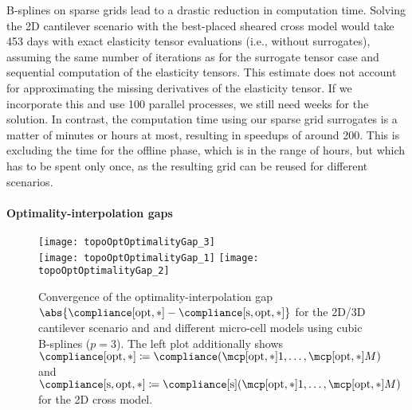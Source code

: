 B-splines on sparse grids lead to a drastic reduction in computation time.
Solving the 2D cantilever scenario with the best-placed sheared cross model
would take 453 days with
exact elasticity tensor evaluations (i.e., without surrogates),
assuming the same number of iterations as for the surrogate tensor case
and sequential computation of the elasticity tensors.
This estimate does not account for approximating the missing derivatives
of the elasticity tensor.
If we incorporate this and use 100 parallel processes,
we still need weeks for the solution.
In contrast, the computation time using our sparse grid surrogates
is a matter of minutes or hours at most,
resulting in speedups of around 200.
This is excluding the time for the offline phase,
which is in the range of hours, but which has to be spent only once,
as the resulting grid can be reused for different scenarios.

\vspace{2em}

\paragraph{Optimality-interpolation gaps}

\begin{figure}
  \texttt{[image: topoOptOptimalityGap\_3]}%
  \\[2mm]%
  \texttt{[image: topoOptOptimalityGap\_1]}%
  \hfill%
  \texttt{[image: topoOptOptimalityGap\_2]}%
  \caption[Convergence of the optimality-interpolation gap]{%
    Convergence of the optimality-interpolation gap
    $\abs{\compliance[\opt,\ast] - \complianceintp[\opt,\ast]}$
    for the 2D/3D cantilever scenario and
    and different micro-cell models using cubic B-splines ($p = 3$).
    The left plot additionally shows
    $\compliance[\opt,\ast]
    \ceq \compliance(\mcpoptappr{1}, \dotsc, \mcpoptappr{M})$ and
    $\complianceintp[\opt,\ast]
    \ceq \complianceintp(\mcpoptappr{1}, \dotsc, \mcpoptappr{M})$
    for the 2D cross model.%
  }%
  \label{fig:topoOptOptimalityGap}%
\end{figure}

